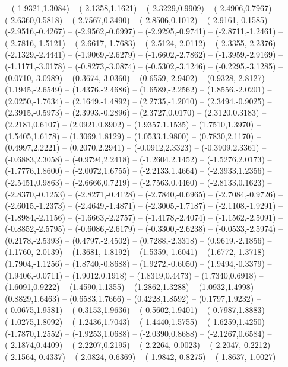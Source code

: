 {	-- (-1.9321,1.3084)
	-- (-2.1358,1.1621)
	-- (-2.3229,0.9909)
	-- (-2.4906,0.7967)
	-- (-2.6360,0.5818)
	-- (-2.7567,0.3490)
	-- (-2.8506,0.1012)
	-- (-2.9161,-0.1585)
	-- (-2.9516,-0.4267)
	-- (-2.9562,-0.6997)
	-- (-2.9295,-0.9741)
	-- (-2.8711,-1.2461)
	-- (-2.7816,-1.5121)
	-- (-2.6617,-1.7683)
	-- (-2.5124,-2.0112)
	-- (-2.3355,-2.2376)
	-- (-2.1329,-2.4441)
	-- (-1.9069,-2.6279)
	-- (-1.6602,-2.7862)
	-- (-1.3959,-2.9169)
	-- (-1.1171,-3.0178)
	-- (-0.8273,-3.0874)
	-- (-0.5302,-3.1246)
	-- (-0.2295,-3.1285)
	-- (0.0710,-3.0989)
	-- (0.3674,-3.0360)
	-- (0.6559,-2.9402)
	-- (0.9328,-2.8127)
	-- (1.1945,-2.6549)
	-- (1.4376,-2.4686)
	-- (1.6589,-2.2562)
	-- (1.8556,-2.0201)
	-- (2.0250,-1.7634)
	-- (2.1649,-1.4892)
	-- (2.2735,-1.2010)
	-- (2.3494,-0.9025)
	-- (2.3915,-0.5973)
	-- (2.3993,-0.2896)
	-- (2.3727,0.0170)
	-- (2.3120,0.3183)
	-- (2.2181,0.6107)
	-- (2.0921,0.8902)
	-- (1.9357,1.1535)
	-- (1.7510,1.3970)
	-- (1.5405,1.6178)
	-- (1.3069,1.8129)
	-- (1.0533,1.9800)
	-- (0.7830,2.1170)
	-- (0.4997,2.2221)
	-- (0.2070,2.2941)
	-- (-0.0912,2.3323)
	-- (-0.3909,2.3361)
	-- (-0.6883,2.3058)
	-- (-0.9794,2.2418)
	-- (-1.2604,2.1452)
	-- (-1.5276,2.0173)
	-- (-1.7776,1.8600)
	-- (-2.0072,1.6755)
	-- (-2.2133,1.4664)
	-- (-2.3933,1.2356)
	-- (-2.5451,0.9863)
	-- (-2.6666,0.7219)
	-- (-2.7563,0.4460)
	-- (-2.8133,0.1623)
	-- (-2.8370,-0.1253)
	-- (-2.8271,-0.4128)
	-- (-2.7840,-0.6965)
	-- (-2.7084,-0.9726)
	-- (-2.6015,-1.2373)
	-- (-2.4649,-1.4871)
	-- (-2.3005,-1.7187)
	-- (-2.1108,-1.9291)
	-- (-1.8984,-2.1156)
	-- (-1.6663,-2.2757)
	-- (-1.4178,-2.4074)
	-- (-1.1562,-2.5091)
	-- (-0.8852,-2.5795)
	-- (-0.6086,-2.6179)
	-- (-0.3300,-2.6238)
	-- (-0.0533,-2.5974)
	-- (0.2178,-2.5393)
	-- (0.4797,-2.4502)
	-- (0.7288,-2.3318)
	-- (0.9619,-2.1856)
	-- (1.1760,-2.0139)
	-- (1.3681,-1.8192)
	-- (1.5359,-1.6041)
	-- (1.6772,-1.3718)
	-- (1.7904,-1.1256)
	-- (1.8740,-0.8688)
	-- (1.9272,-0.6050)
	-- (1.9494,-0.3379)
	-- (1.9406,-0.0711)
	-- (1.9012,0.1918)
	-- (1.8319,0.4473)
	-- (1.7340,0.6918)
	-- (1.6091,0.9222)
	-- (1.4590,1.1355)
	-- (1.2862,1.3288)
	-- (1.0932,1.4998)
	-- (0.8829,1.6463)
	-- (0.6583,1.7666)
	-- (0.4228,1.8592)
	-- (0.1797,1.9232)
	-- (-0.0675,1.9581)
	-- (-0.3153,1.9636)
	-- (-0.5602,1.9401)
	-- (-0.7987,1.8883)
	-- (-1.0275,1.8092)
	-- (-1.2436,1.7043)
	-- (-1.4440,1.5755)
	-- (-1.6259,1.4250)
	-- (-1.7870,1.2552)
	-- (-1.9253,1.0688)
	-- (-2.0390,0.8688)
	-- (-2.1267,0.6584)
	-- (-2.1874,0.4409)
	-- (-2.2207,0.2195)
	-- (-2.2264,-0.0023)
	-- (-2.2047,-0.2212)
	-- (-2.1564,-0.4337)
	-- (-2.0824,-0.6369)
	-- (-1.9842,-0.8275)
	-- (-1.8637,-1.0027)
}
